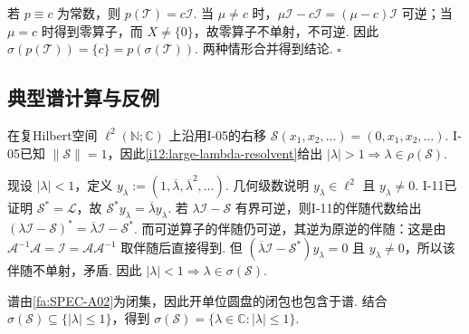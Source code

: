 \begin{FAProof}
若 \(\displaystyle p\equiv c\) 为常数，则 \(\displaystyle p(\mathcal T)=c\mathcal I\). 当 \(\displaystyle \mu\neq c\) 时，\(\displaystyle \mu\mathcal I-c\mathcal I=(\mu-c)\mathcal I\) 可逆；当 \(\displaystyle \mu=c\) 时得到零算子，而 \(\displaystyle X\neq\{0\}\)，故零算子不单射，不可逆. 因此
\(\displaystyle \sigma(p(\mathcal T)) = \{c\} = p(\sigma(\mathcal T))\).
两种情形合并得到结论.
\hfill\(\square\)
\end{FAProof}

\subsection{典型谱计算与反例}\label{subsec:i12-examples}

\begin{FAExample}[右移的完整谱]\label{i12:shift-spectrum}
在复Hilbert空间 \(\displaystyle \ell^2(\mathbb N;\mathbb C)\) 上沿用I-05的右移
\(\displaystyle \mathcal S(x_1,x_2,\dots) = (0,x_1,x_2,\dots)\).
I-05已知 \(\displaystyle \|\mathcal S\|=1\)，因此\autoref{i12:large-lambda-resolvent}给出 \(\displaystyle |\lambda|>1\Rightarrow\lambda\in\rho(\mathcal S)\).

现设 \(\displaystyle |\lambda|<1\)，定义
\(\displaystyle y_\lambda := (1,\overline\lambda,\overline\lambda^2,\dots)\).
几何级数说明 \(\displaystyle y_\lambda\in\ell^2\) 且 \(\displaystyle y_\lambda\neq0\). I-11已证明 \(\displaystyle \mathcal S^*=\mathcal L\)，故
\(\displaystyle \mathcal S^*y_\lambda = \overline\lambda y_\lambda\).
若 \(\displaystyle \lambda\mathcal I-\mathcal S\) 有界可逆，则I-11的伴随代数给出
\(\displaystyle (\lambda\mathcal I-\mathcal S)^* = \overline\lambda\mathcal I-\mathcal S^*\).
而可逆算子的伴随仍可逆，其逆为原逆的伴随：这是由 \(\displaystyle \mathcal A^{-1}\mathcal A=\mathcal I=\mathcal A\mathcal A^{-1}\) 取伴随后直接得到. 但 \(\displaystyle (\overline\lambda\mathcal I-\mathcal S^*)y_\lambda=0\) 且 \(\displaystyle y_\lambda\neq0\)，所以该伴随不单射，矛盾. 因此 \(\displaystyle |\lambda|<1\Rightarrow\lambda\in\sigma(\mathcal S)\).

谱由\autoref{fa:SPEC-A02}为闭集，因此开单位圆盘的闭包也包含于谱. 结合 \(\displaystyle \sigma(\mathcal S)\subseteq\{|\lambda|\leqslant1\}\)，得到
\(\displaystyle \sigma(\mathcal S) = \{\lambda\in\mathbb C:|\lambda|\leqslant1\}\).
\end{FAExample}

